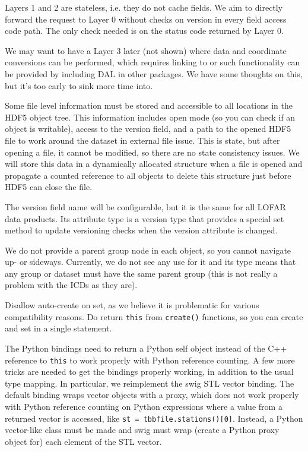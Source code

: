 \documentclass[a4paper,11pt]{article}
\begin{document}
\begin{enumerate}[label=\it D.\arabic{*}]
Layers 1 and 2 are stateless, i.e. they do not cache fields. We aim to directly forward the request to Layer 0 without checks on version in every field access code path.
The only check needed is on the status code returned by Layer 0.

We may want to have a Layer 3 later (not shown) where data and coordinate conversions can be performed, which requires linking to or such functionality can be provided by including DAL in other packages.
We have some thoughts on this, but it's too early to sink more time into.

Some file level information must be stored and accessible to all locations in the HDF5 object tree.
This information includes open mode (so you can check if an object is writable), access to the version field, and a path to the opened HDF5 file to work around the dataset in external file issue.
This is state, but after opening a file, it cannot be modified, so there are no state consistency issues.
We will store this data in a dynamically allocated structure when a file is opened and propagate a counted reference to all objects to delete this structure just before HDF5 can close the file.

The version field name will be configurable, but it is the same for all LOFAR data products.
Its attribute type is a version type that provides a special set method to update versioning checks when the version attribute is changed.

We do not provide a parent group node in each object, so you cannot navigate up- or sideways.
Currently, we do not see any use for it and its type means that any group or dataset must have the same parent group (this is not really a problem with the ICDs as they are).

Disallow auto-create on set, as we believe it is problematic for various compatibility reasons.
Do return \texttt{this} from \texttt{create()} functions, so you can create and set in a single statement.

The Python bindings need to return a Python self object instead of the C++ reference to \texttt{this} to work properly with Python reference counting.
A few more tricks are needed to get the bindings properly working, in addition to the usual type mapping.
In particular, we reimplement the swig STL vector binding.
The default binding wraps vector objects with a proxy, which does not work properly with Python reference counting on Python expressions where a value from a returned vector is accessed, like \texttt{st = tbbfile.stations()[0]}.
Instead, a Python vector-like class must be made and swig must wrap (create a Python proxy object for) each element of the STL vector.


\end{enumerate}
\end{document}

